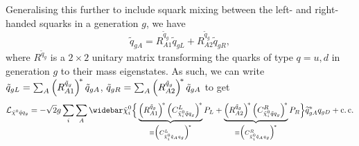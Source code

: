 \documentclass[../main.tex]{subfiles}
\begin{document}
Generalising this further to include squark mixing between the left- and
right-handed squarks in a generation \(g\), we have
\begin{equation}
  \tilde{q}_{gA} = R_{A1}^{\tilde{q}_g} \tilde{q}_{gL} + R_{A2}^{\tilde{q}_g} \tilde{q}_{gR},
\end{equation}
where \(R^{\tilde{q}_g}\) is a \(2\times 2\) unitary matrix transforming the quarks of type \(q = u, d\) in generation \(g\) to their mass eigenstates.
As such, we can write \(\tilde{q}_{gL} = \sum_A \left(R^{\tilde{q}_g}_{A1}\right)^{\!\ast} \tilde{q}_{gA}\), \(\tilde{q}_{gR} = \sum_A \left(R^{\tilde{q}_g}_{A2}\right)^{\!\ast} \tilde{q}_{gA}\) to get
\begin{equation}
  \label{susy:eq:nino_sqA_f_int}
  \L_{\tilde{\chi}^0 \tilde{q} q_g} = -\sqrt{2} g \sum_{i} \sum_A \barnino[i] \Big\{ \underbrace{\pclosed{R^{\tilde{q}_g}_{A1}}^{\!\ast} \pclosed{C_{\tilde{\chi}^0_i \tilde{q} q_g}^{L}}^{\!\ast}}_{\equiv \Big(C_{\tilde{\chi}^0_i \tilde{q}_A q_g}^{L}\Big)^{\!\ast}} P_L + \underbrace{\pclosed{R^{\tilde{q}_g}_{A2}}^{\!\ast} \pclosed{C_{\tilde{\chi}^0_i \tilde{q} q_g}^{R}}^{\!\ast}}_{\equiv \Big(C_{\tilde{\chi}^0_i \tilde{q}_A q_g}^{R}\Big)^{\!\ast}} P_R \Big\} \wtilde{q}_{gA}^\ast q_{gD} + \cc
\end{equation}
\end{document}
